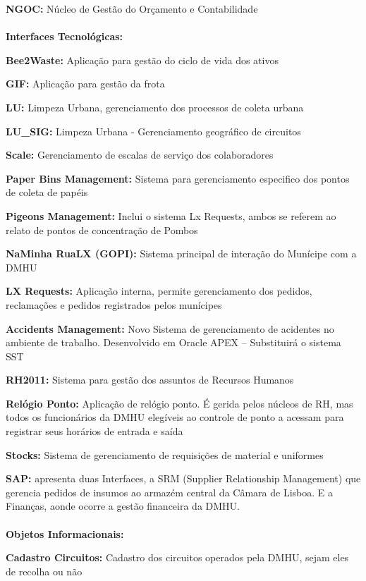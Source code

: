 \documentclass[12pt,a4paper,final]{article}
\begin{document}
    \textbf{NGOC:} Núcleo de Gestão do Orçamento e Contabilidade
\\
    \\
    \textbf{Interfaces Tecnológicas:}

    \textbf{Bee2Waste:} Aplicação para gestão do ciclo de vida dos ativos

    \textbf{GIF:} Aplicação para gestão da frota

    \textbf{LU:} Limpeza Urbana, gerenciamento dos processos de coleta urbana

    \textbf{LU\_SIG:} Limpeza Urbana - Gerenciamento geográfico de circuitos

    \textbf{Scale:} Gerenciamento de escalas de serviço dos colaboradores

    \textbf{Paper Bins Management:} Sistema para gerenciamento especifico dos pontos de coleta de papéis

    \textbf{Pigeons Management:} Inclui o sistema Lx Requests, ambos se referem ao relato de pontos de concentração
    de Pombos

    \textbf{NaMinha RuaLX (GOPI):} Sistema principal de interação do Munícipe com a DMHU

    \textbf{LX Requests:} Aplicação interna, permite gerenciamento dos pedidos, reclamações e pedidos registrados pelos munícipes

    \textbf{Accidents Management:} Novo Sistema de gerenciamento de acidentes no ambiente de trabalho. Desenvolvido em Oracle APEX – Substituirá o sistema SST

    \textbf{RH2011:} Sistema para gestão dos assuntos de Recursos Humanos

    \textbf{Relógio Ponto:} Aplicação de relógio ponto. É gerida pelos núcleos de RH, mas todos os funcionários da DMHU elegíveis ao controle de ponto a acessam para registrar seus horários de entrada e saída

    \textbf{Stocks:} Sistema de gerenciamento de requisições de material e uniformes

    \textbf{SAP:} apresenta duas Interfaces, a SRM (Supplier Relationship Management) que gerencia pedidos de insumos ao armazém central da Câmara de Lisboa. E a Finanças, aonde ocorre a gestão financeira da DMHU.
\\
    \\
    \textbf{Objetos Informacionais:}

    \textbf{Cadastro Circuitos:} Cadastro dos circuitos operados pela DMHU, sejam eles de recolha ou não
\end{document}

